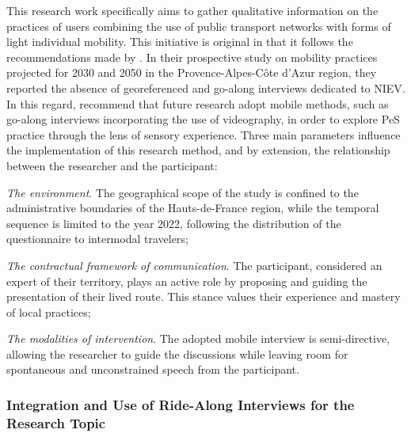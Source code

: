 \begin{refsegment}
This research work specifically aims to gather qualitative information on the practices of users combining the use of public transport networks with forms of light individual mobility. This initiative is original in that it follows the recommendations made by \textcolor{blue}{\textcite[11]{pages_nouveaux_2021}}. In their prospective study on mobility practices projected for 2030 and 2050 in the Provence-Alpes-Côte d'Azur region, they reported the absence of georeferenced and go-along interviews dedicated to \acrfull{NIEV}. In this regard, \textcolor{blue}{\textcite[13]{gibson_blurred_2021}} recommend that future research adopt mobile methods, such as go-along interviews incorporating the use of videography, in order to explore \acrshort{PeS} practice through the lens of sensory experience. Three main parameters influence the implementation of this research method, and by extension, the relationship between the researcher and the participant:
\begin{customitemize}
    \item \textsl{The environment}. The geographical scope of the study is confined to the administrative boundaries of the Hauts-de-France region, while the temporal sequence is limited to the year 2022, following the distribution of the questionnaire to intermodal travelers;
    \item \textsl{The contractual framework of communication}. The participant, considered an expert of their territory, plays an active role by proposing and guiding the presentation of their lived route. This stance values their experience and mastery of local practices;
    \item \textsl{The modalities of intervention}. The adopted mobile interview is semi-directive, allowing the researcher to guide the discussions while leaving room for spontaneous and unconstrained speech from the participant.
\end{customitemize}%

\subsubsection*{Integration and Use of Ride-Along Interviews for the Research Topic
    \label{chap3:parcours-commente-administration-methode}
    }


\end{refsegment}
